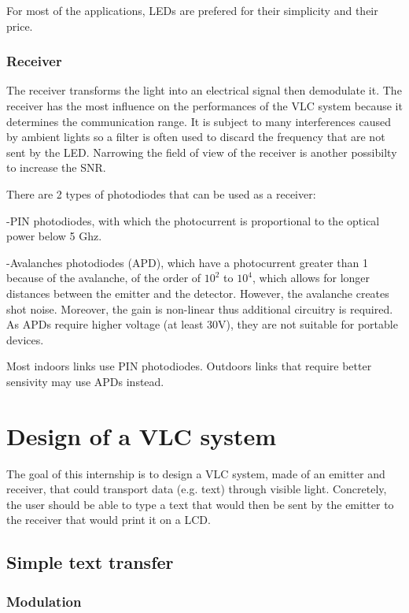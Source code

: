 \documentclass[12pt]{report}
\begin{document}
For most of the applications, LEDs are prefered for their simplicity and their price.

\subsection{Receiver}

The receiver transforms the light into an electrical signal then demodulate it. The receiver has the most influence on the performances of the VLC system because it determines the communication range. It is subject to many interferences caused by ambient lights so a filter is often used to discard the frequency that are not sent by the LED. Narrowing the field of view of the receiver is another possibilty to increase the SNR.

There are 2 types of photodiodes that can be used as a receiver:

-PIN photodiodes, with which the photocurrent is proportional to the optical power below 5 Ghz.

-Avalanches photodiodes (APD), which have a photocurrent greater than 1 because of the avalanche, of the order of $10^2$ to $10^4$, which allows for longer distances between the emitter and the detector. However, the avalanche creates shot noise. Moreover, the gain is non-linear thus additional circuitry is required. As APDs require higher voltage (at least 30V), they are not suitable for portable devices.

Most indoors links use PIN photodiodes. Outdoors links that require better sensivity may use APDs instead.



\chapter{Design of a VLC system}

The goal of this internship is to design a VLC system, made of an emitter and receiver, that could transport data (e.g. text) through visible light.
Concretely, the user should be able to type a text that would then be sent by the emitter to the receiver that would print it on a LCD.

\section{Simple text transfer}

\subsection{Modulation}
\end{document}
